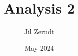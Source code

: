 \documentclass[a4paper, fontsize = 8pt, landscape]{scrartcl}
\title{Analysis 2}
\author{Jil Zerndt}
\date{May 2024}
\begin{document}
\begin{multicols}{3}
	\thispagestyle{TitlePageStyle}
	\maketitle
	
	\raggedcolumns
	\newpage
	
	\raggedcolumns
	\columnbreak
	
	\raggedcolumns
	\newpage
	
	\raggedcolumns
	
	\raggedcolumns
	\newpage
	
	\raggedcolumns
\end{multicols}
\end{document}
